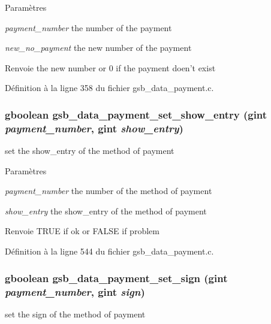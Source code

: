 \begin{DoxyParams}{Paramètres}
\item[{\em payment\_\-number}]the number of the payment \item[{\em new\_\-no\_\-payment}]the new number of the payment\end{DoxyParams}
\begin{DoxyReturn}{Renvoie}
the new number or 0 if the payment doen't exist 
\end{DoxyReturn}


Définition à la ligne 358 du fichier gsb\_\-data\_\-payment.c.

\subsubsection[{gsb\_\-data\_\-payment\_\-set\_\-show\_\-entry}]{\setlength{\rightskip}{0pt plus 5cm}gboolean gsb\_\-data\_\-payment\_\-set\_\-show\_\-entry (gint {\em payment\_\-number}, \/  gint {\em show\_\-entry})}\label{gsb__data__payment_8c_ab1a0de140307670fff65c15ec703a1dd}
set the show\_\-entry of the method of payment


\begin{DoxyParams}{Paramètres}
\item[{\em payment\_\-number}]the number of the method of payment \item[{\em show\_\-entry}]the show\_\-entry of the method of payment\end{DoxyParams}
\begin{DoxyReturn}{Renvoie}
TRUE if ok or FALSE if problem 
\end{DoxyReturn}


Définition à la ligne 544 du fichier gsb\_\-data\_\-payment.c.

\subsubsection[{gsb\_\-data\_\-payment\_\-set\_\-sign}]{\setlength{\rightskip}{0pt plus 5cm}gboolean gsb\_\-data\_\-payment\_\-set\_\-sign (gint {\em payment\_\-number}, \/  gint {\em sign})}\label{gsb__data__payment_8c_a59432ce2f2e199d8e5eb5a1edca94ee9}
set the sign of the method of payment


